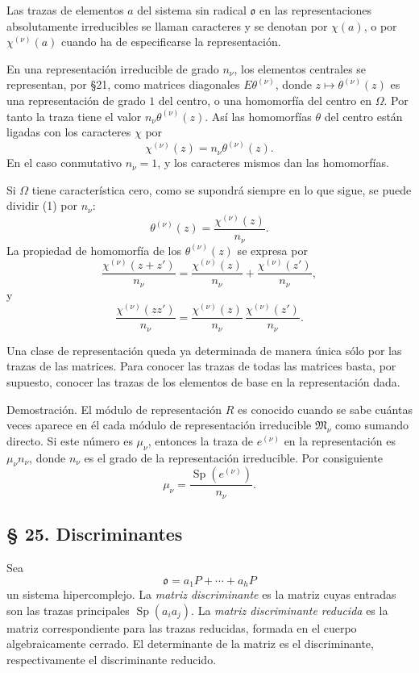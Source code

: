 \documentclass[11pt]{article}
\providecommand{\mM}{\mathfrak{M}}
\providecommand{\mo}{\mathfrak{o}}
\begin{document}
Las trazas de elementos $a$ del sistema sin radical $\mo$ en las representaciones absolutamente irreducibles se llaman caracteres y se denotan por $\chi(a)$, o por $\chi^{(\nu)}(a)$ cuando ha de especificarse la representación.

En una representación irreducible de grado $n_\nu$, los elementos centrales se representan, por §21, como matrices diagonales $E\theta^{(\nu)}$, donde $z\mapsto\theta^{(\nu)}(z)$ es una representación de grado $1$ del centro, o una homomorfía del centro en $\Omega$. Por tanto la traza tiene el valor $n_\nu\theta^{(\nu)}(z)$. Así las homomorfías $\theta$ del centro están ligadas con los caracteres $\chi$ por
\[
        \chi^{(\nu)}(z)=n_\nu\theta^{(\nu)}(z).              \tag{1}
\]
En el caso conmutativo $n_\nu=1$, y los caracteres mismos dan las homomorfías.

Si $\Omega$ tiene característica cero, como se supondrá siempre en lo que sigue, se puede dividir (1) por $n_\nu$:
\[
        \theta^{(\nu)}(z)=\frac{\chi^{(\nu)}(z)}{n_\nu}.
\]
La propiedad de homomorfía de los $\theta^{(\nu)}(z)$ se expresa por
\[
        \frac{\chi^{(\nu)}(z+z')}{n_\nu}
        =\frac{\chi^{(\nu)}(z)}{n_\nu}
         +\frac{\chi^{(\nu)}(z')}{n_\nu},
\]
y
\[
        \frac{\chi^{(\nu)}(zz')}{n_\nu}
        =\frac{\chi^{(\nu)}(z)}{n_\nu}\,
         \frac{\chi^{(\nu)}(z')}{n_\nu}.
\]

Una clase de representación queda ya determinada de manera única sólo por las trazas de las matrices. Para conocer las trazas de todas las matrices basta, por supuesto, conocer las trazas de los elementos de base en la representación dada.

Demostración. El módulo de representación $R$ es conocido cuando se sabe cuántas veces aparece en él cada módulo de representación irreducible $\mM_\nu$ como sumando directo. Si este número es $\mu_\nu$, entonces la traza de $e^{(\nu)}$ en la representación es $\mu_\nu n_\nu$, donde $n_\nu$ es el grado de la representación irreducible. Por consiguiente
\[
        \mu_\nu=\frac{\operatorname{Sp}(e^{(\nu)})}{n_\nu}.
\]

\subsection*{§ 25. Discriminantes}

Sea
\[
        \mo=a_1P+\cdots+a_hP
\]
un sistema hipercomplejo. La \emph{matriz discriminante} es la matriz cuyas entradas son las trazas principales $\operatorname{Sp}(a_i a_j)$. La \emph{matriz discriminante reducida} es la matriz correspondiente para las trazas reducidas, formada en el cuerpo algebraicamente cerrado. El determinante de la matriz es el discriminante, respectivamente el discriminante reducido.
\end{document}
